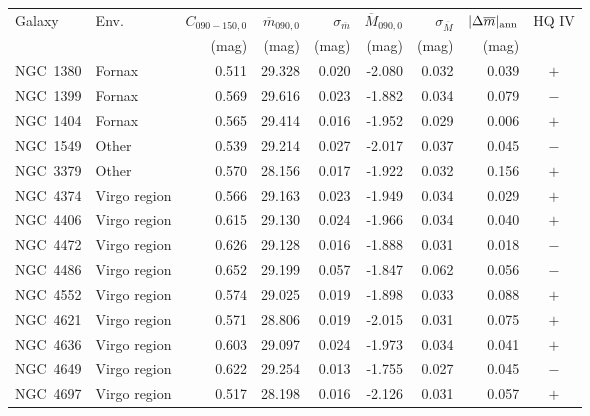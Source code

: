 \begin{tabular}{llrrrrrrc}
\toprule
Galaxy & Env. & $C_{090-150,0}$ & $\overline m_{090,0}$ & $\sigma_{\overline m}$ & $\overline M_{090,0}$ & $\sigma_{\overline M}$ & $|\Delta\overline m|_{\rm ann}$ & HQ IV \\
 & & (mag) & (mag) & (mag) & (mag) & (mag) & (mag) & \\
\midrule
NGC~1380 & Fornax & 0.511 & 29.328 & 0.020 & -2.080 & 0.032 & 0.039 & $+$ \\
NGC~1399 & Fornax & 0.569 & 29.616 & 0.023 & -1.882 & 0.034 & 0.079 & $-$ \\
NGC~1404 & Fornax & 0.565 & 29.414 & 0.016 & -1.952 & 0.029 & 0.006 & $+$ \\
NGC~1549 & Other & 0.539 & 29.214 & 0.027 & -2.017 & 0.037 & 0.045 & $-$ \\
NGC~3379 & Other & 0.570 & 28.156 & 0.017 & -1.922 & 0.032 & 0.156 & $+$ \\
NGC~4374 & Virgo region & 0.566 & 29.163 & 0.023 & -1.949 & 0.034 & 0.029 & $+$ \\
NGC~4406 & Virgo region & 0.615 & 29.130 & 0.024 & -1.966 & 0.034 & 0.040 & $+$ \\
NGC~4472 & Virgo region & 0.626 & 29.128 & 0.016 & -1.888 & 0.031 & 0.018 & $-$ \\
NGC~4486 & Virgo region & 0.652 & 29.199 & 0.057 & -1.847 & 0.062 & 0.056 & $-$ \\
NGC~4552 & Virgo region & 0.574 & 29.025 & 0.019 & -1.898 & 0.033 & 0.088 & $+$ \\
NGC~4621 & Virgo region & 0.571 & 28.806 & 0.019 & -2.015 & 0.031 & 0.075 & $+$ \\
NGC~4636 & Virgo region & 0.603 & 29.097 & 0.024 & -1.973 & 0.034 & 0.041 & $+$ \\
NGC~4649 & Virgo region & 0.622 & 29.254 & 0.013 & -1.755 & 0.027 & 0.045 & $-$ \\
NGC~4697 & Virgo region & 0.517 & 28.198 & 0.016 & -2.126 & 0.031 & 0.057 & $+$ \\
\bottomrule
\end{tabular}
